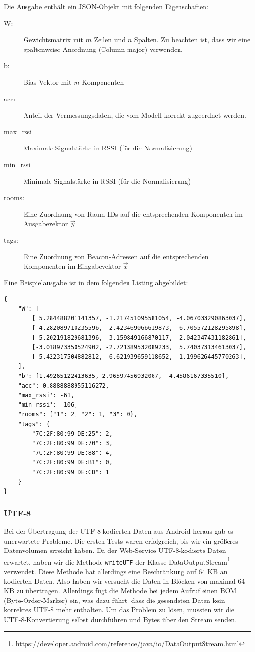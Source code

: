 Die Ausgabe enthält ein JSON-Objekt mit folgenden Eigenschaften:
\begin{description}
	\item[W:] Gewichtsmatrix mit $m$ Zeilen und $n$ Spalten. Zu beachten ist, dass wir eine
		spaltenweise Anordnung (Column-major) verwenden.
	\item[b:] Bias-Vektor mit $m$ Komponenten
	\item[acc:] Anteil der Vermessungsdaten, die vom Modell korrekt zugeordnet werden.
	\item[max\_rssi] Maximale Signalstärke in RSSI (für die Normalisierung)
	\item[min\_rssi] Minimale Signalstärke in RSSI (für die Normalisierung)
	\item[rooms:] Eine Zuordnung von Raum-IDs auf die entsprechenden Komponenten im
		Ausgabevektor $\vec{y}$
	\item[tags:] Eine Zuordnung von Beacon-Adressen auf die entsprechenden Komponenten
		im Eingabevektor $\vec{x}$
\end{description}

Eine Beispielausgabe ist in dem folgenden Listing abgebildet:
\begin{lstlisting}
{
	"W": [
		[ 5.284488201141357, -1.217451095581054, -4.067033290863037],
		[-4.282089710235596, -2.423469066619873,  6.705572128295898],
		[ 5.202191829681396, -3.159849166870117, -2.042347431182861],
		[-3.018973350524902, -2.721389532089233,  5.740373134613037],
		[-5.422317504882812,  6.621939659118652, -1.199626445770263],
	],
	"b": [1.49265122413635, 2.96597456932067, -4.4586167335510],
	"acc": 0.8888888955116272,
	"max_rssi": -61,
	"min_rssi": -106,
	"rooms": {"1": 2, "2": 1, "3": 0},
	"tags": {
		"7C:2F:80:99:DE:25": 2,
		"7C:2F:80:99:DE:70": 3,
		"7C:2F:80:99:DE:88": 4,
		"7C:2F:80:99:DE:B1": 0,
		"7C:2F:80:99:DE:CD": 1
	}
}
\end{lstlisting}

\subsubsection{UTF-8}
Bei der Übertragung der UTF-8-kodierten Daten aus Android heraus gab es unerwartete Probleme.
Die ersten Tests waren erfolgreich, bis wir ein größeres Datenvolumen erreicht haben.
Da der Web-Service UTF-8-kodierte Daten erwartet, haben wir die Methode \texttt{writeUTF}
der Klasse DataOutputStream\footnote{\url{https://developer.android.com/reference/java/io/DataOutputStream.html}} 
verwendet. Diese Methode hat allerdings eine Beschränkung auf 64 KB an kodierten Daten.
Also haben wir versucht die Daten in Blöcken von maximal 64 KB zu übertragen. Allerdings
fügt die Methode bei jedem Aufruf einen BOM (Byte-Order-Marker) ein, was dazu führt,
dass die gesendeten Daten kein korrektes UTF-8 mehr enthalten.
Um das Problem zu lösen, mussten wir die UTF-8-Konvertierung selbst durchführen
und Bytes über den Stream senden.

